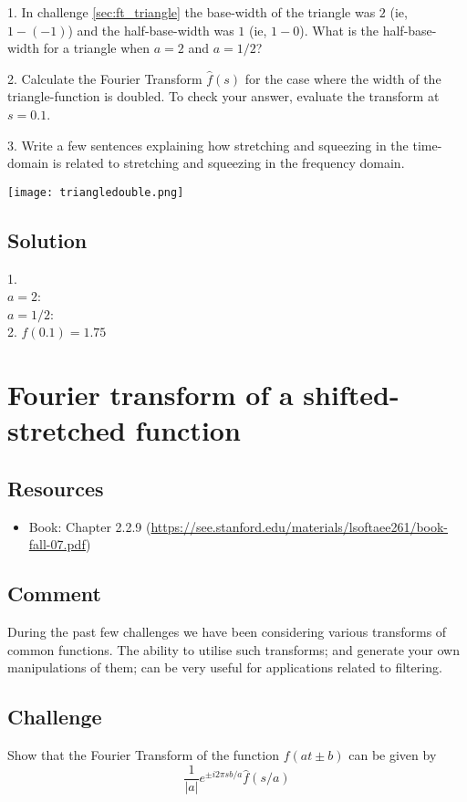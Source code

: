1. In challenge \ref{sec:ft_triangle} the base-width of the triangle was $2$ (ie, $1-(-1)$) and the half-base-width was $1$ (ie, $1-0$). What is the half-base-width for a triangle when $a=2$ and $a=1/2$?

2. Calculate the Fourier Transform $\hat{f}(s)$ for the case where the width of the triangle-function is doubled. To check your answer, evaluate the transform at $s=0.1$.

3. Write a few sentences explaining how stretching and squeezing in the time-domain is related to stretching and squeezing in the frequency domain.

\texttt{[image: triangledouble.png]}

\subsection*{Solution}
1.\\
$a=2$: \\
$a=1/2$: \\

2. $\hat{f}(0.1)=1.75$




\newpage
\section{Fourier transform of a shifted-stretched function}

\subsection*{Resources}
\begin{itemize}
    \item Book: Chapter 2.2.9 (\url{https://see.stanford.edu/materials/lsoftaee261/book-fall-07.pdf})
\end{itemize}

\subsection*{Comment}
During the past few challenges we have been considering various transforms of common functions. The ability to utilise such transforms; and generate your own manipulations of them; can be very useful for applications related to filtering.

\subsection*{Challenge}
Show that the Fourier Transform of the function $f(at\pm b)$ can be given by
\begin{equation}
    \frac{1}{|a|} e^{\pm i 2 \pi s b/a} \hat{f}(s/a)
\end{equation}










